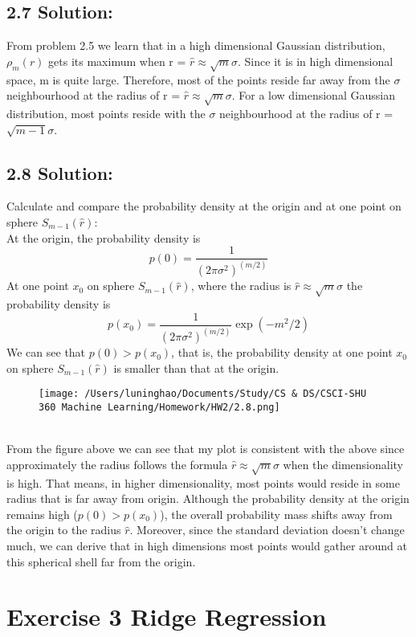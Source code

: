 \documentclass{article}
\begin{document}
\subsection*{2.7 Solution:}
From problem 2.5 we learn that in a high dimensional Gaussian distribution, $\rho_m(r)$ gets its maximum when r = $\hat{r} \approx \sqrt{m} \sigma$. Since it is in high dimensional space, m is quite large. Therefore,  most of the points reside far away from the $\sigma$ neighbourhood at the radius of r = $\hat{r} \approx \sqrt{m} \sigma$.
For a low dimensional Gaussian distribution, most points reside with the $\sigma$ neighbourhood at the radius of r = $\sqrt{m-1} \sigma$.

\subsection*{2.8 Solution:}
Calculate and compare the probability density at the origin and at one point on sphere $S_{m-1}(\hat{r})$:\\
At the origin, the probability density is
\[p(0) = \frac{1}{(2 \pi \sigma^2)^(m/2)}\]
At one point $x_0$ on sphere $S_{m-1} (\hat{r})$, where the radius is $\hat{r} \approx \sqrt{m}\sigma$ the probability density is
\[p(x_0) = \frac{1}{(2 \pi \sigma^2)^(m/2)} \exp(-m^2 / 2)\]
We can see that $p(0) > p(x_0)$, that is, the probability density at one point $x_0$ on sphere $S_{m-1} (\hat{r})$ is smaller than that at the origin.
\begin{figure}[h]
    \centering
    \texttt{[image: /Users/luninghao/Documents/Study/CS \& DS/CSCI-SHU 360 Machine Learning/Homework/HW2/2.8.png]}
\end{figure}\\
From the figure above we can see that my plot is consistent with the above since approximately the radius follows the formula $\hat{r} \approx \sqrt{m} \sigma$ when the dimensionality is high. That means, in higher dimensionality, most points would reside in some radius that is far away from origin.
Although the probability density at the origin remains high ($p(0) > p(x_0)$), the overall probability mass shifts away from the origin to the radius $\hat{r}$.
Moreover, since the standard deviation doesn't change much, we can derive that in high dimensions most points would gather around at this spherical shell far from the origin.

\newpage
\section*{Exercise 3 Ridge Regression}
\end{document}
